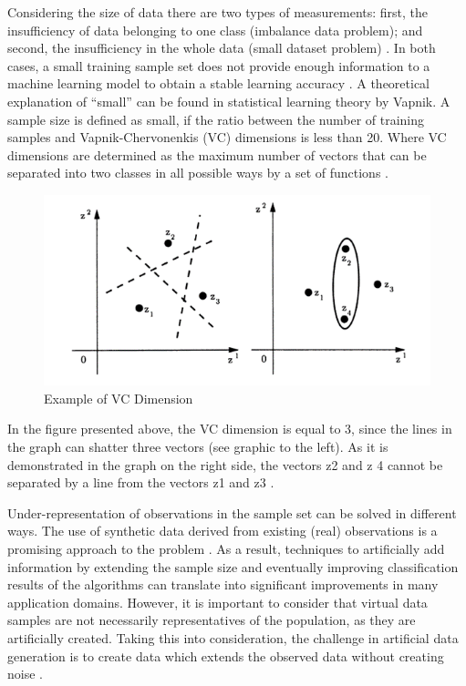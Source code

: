 \documentclass[parskip=full]{scrartcl}
\begin{document}
Considering the size of data there are two types of measurements: first, the 
insufficiency of data belonging to one class (imbalance data problem); and 
second, the insufficiency in the whole data (small dataset problem) 
\cite{Sezer.2014}. In both cases, a small training sample set does not provide 
enough information to a machine learning model to obtain a stable learning 
accuracy \cite{Tsai.2008}. A theoretical explanation of “small” can be found in 
statistical learning theory by Vapnik. A sample size is defined as small, if 
the ratio between the number of training samples and Vapnik-Chervonenkis (VC) 
dimensions is less than 20. Where VC dimensions are determined as the maximum 
number of vectors that can be separated into two classes in all possible ways 
by a set of functions \cite{Vapnik.2008}. 

\begin{figure}[H]
	\centering
	\includegraphics[width=0.6\linewidth]{"./resources/vc_dimension"}
	\caption{Example of VC Dimension \cite{Vapnik.2008}}
	\label{fig:vc-dimension}
\end{figure}

In the figure presented above, the VC dimension is equal to 3, since the lines
in the graph can shatter three vectors (see graphic to the left). As it is
demonstrated in the graph on the right side, the vectors z{\tiny 2} and z{\tiny
4} cannot be separated by a line from the vectors z{\tiny 1} and z{\tiny 3}
\cite{Vapnik.2008}.

Under-representation of observations in the sample set can be solved in 
different ways. The use of synthetic data derived from existing (real) 
observations is a promising approach to the problem \cite{Sezer.2014}. As a 
result, techniques to artificially add information by extending the sample size 
and eventually improving classification results of the algorithms can translate 
into significant improvements in many application domains. However, it is 
important to consider that virtual data samples are not necessarily 
representatives of the population, as they are artificially created. Taking 
this into consideration, the challenge in artificial data generation is to 
create data which extends the observed data without creating noise 
\cite{Li.2006}. 
\end{document}
